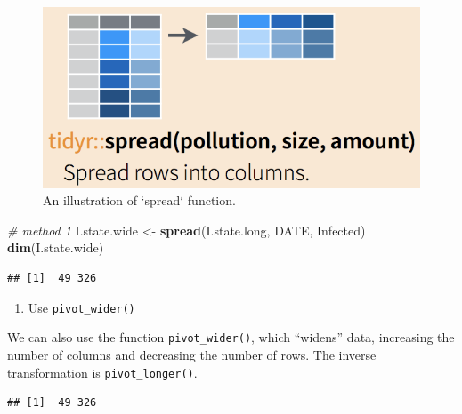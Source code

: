 \documentclass[]{book}
\newenvironment{Shaded}{\begin{snugshade}}{\end{snugshade}}
\newcommand{\KeywordTok}[1]{\textcolor[rgb]{0.13,0.29,0.53}{\textbf{#1}}}
\newcommand{\DataTypeTok}[1]{\textcolor[rgb]{0.13,0.29,0.53}{#1}}
\newcommand{\StringTok}[1]{\textcolor[rgb]{0.31,0.60,0.02}{#1}}
\newcommand{\CommentTok}[1]{\textcolor[rgb]{0.56,0.35,0.01}{\textit{#1}}}
\newcommand{\OperatorTok}[1]{\textcolor[rgb]{0.81,0.36,0.00}{\textbf{#1}}}
\newcommand{\NormalTok}[1]{#1}
\providecommand{\tightlist}{%
  \setlength{\itemsep}{0pt}\setlength{\parskip}{0pt}}
\begin{document}
\begin{figure}

{\centering \includegraphics[width=0.5\linewidth]{figures/spread} 

}

\caption{An illustration of `spread` function.}\label{fig:spread}
\end{figure}

\begin{Shaded}
\begin{Highlighting}[]
\CommentTok{# method 1}
\NormalTok{I.state.wide <-}\StringTok{ }\KeywordTok{spread}\NormalTok{(I.state.long, DATE, Infected)}
\KeywordTok{dim}\NormalTok{(I.state.wide)}
\end{Highlighting}
\end{Shaded}

\begin{verbatim}
## [1]  49 326
\end{verbatim}

\begin{enumerate}
\def\labelenumi{\arabic{enumi}.}
\setcounter{enumi}{1}
\tightlist
\item
  Use \texttt{pivot\_wider()}
\end{enumerate}

We can also use the function \texttt{pivot\_wider()}, which ``widens''
data, increasing the number of columns and decreasing the number of
rows. The inverse transformation is \texttt{pivot\_longer()}.

\begin{Shaded}
\end{Shaded}

\begin{verbatim}
## [1]  49 326
\end{verbatim}
\end{document}
